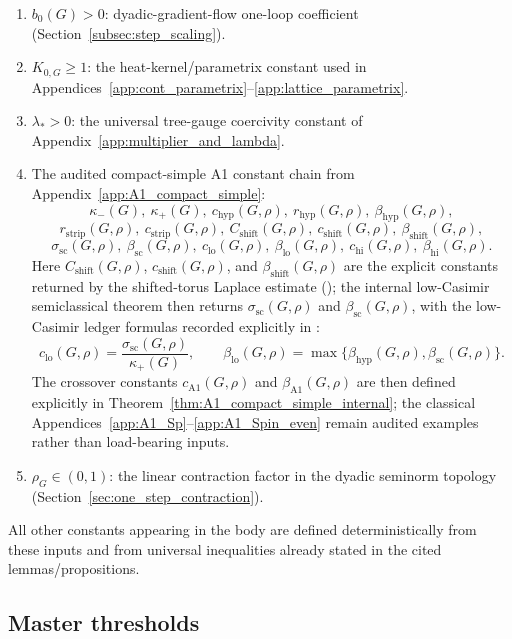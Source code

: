 \begin{enumerate}[label=(P\arabic*),leftmargin=*]
\item $b_0(G)>0$: dyadic-gradient-flow one-loop coefficient (Section~\ref{subsec:step_scaling}).
\item $K_{0,G}\ge 1$: the heat-kernel/parametrix constant used in Appendices~\ref{app:cont_parametrix}--\ref{app:lattice_parametrix}.
\item $\lambda_\ast>0$: the universal tree-gauge coercivity constant of Appendix~\ref{app:multiplier_and_lambda}.
\item The audited compact-simple A1 constant chain from Appendix~\ref{app:A1_compact_simple}:
\[
\kappa_-(G),\ \kappa_+(G),\ c_{\mathrm{hyp}}(G,\rho),\ r_{\mathrm{hyp}}(G,\rho),\ \beta_{\mathrm{hyp}}(G,\rho),
\]
\[
r_{\mathrm{strip}}(G,\rho),\ c_{\mathrm{strip}}(G,\rho),\ C_{\mathrm{shift}}(G,\rho),\ c_{\mathrm{shift}}(G,\rho),\ \beta_{\mathrm{shift}}(G,\rho),
\]
\[
\sigma_{\mathrm{sc}}(G,\rho),\ \beta_{\mathrm{sc}}(G,\rho),\ c_{\mathrm{lo}}(G,\rho),\ \beta_{\mathrm{lo}}(G,\rho),\ c_{\mathrm{hi}}(G,\rho),\ \beta_{\mathrm{hi}}(G,\rho).
\]
Here $C_{\mathrm{shift}}(G,\rho)$, $c_{\mathrm{shift}}(G,\rho)$, and $\beta_{\mathrm{shift}}(G,\rho)$ are the explicit constants returned by the shifted-torus Laplace estimate
(); the internal low-Casimir semiclassical theorem 
then returns $\sigma_{\mathrm{sc}}(G,\rho)$ and $\beta_{\mathrm{sc}}(G,\rho)$, with the low-Casimir ledger formulas recorded explicitly in :
\[
c_{\mathrm{lo}}(G,\rho)=\frac{\sigma_{\mathrm{sc}}(G,\rho)}{\kappa_+(G)},
\qquad
\beta_{\mathrm{lo}}(G,\rho)=\max\{\beta_{\mathrm{hyp}}(G,\rho),\beta_{\mathrm{sc}}(G,\rho)\}.
\]
The crossover constants $c_{\mathrm{A1}}(G,\rho)$ and $\beta_{\mathrm{A1}}(G,\rho)$ are then defined explicitly in Theorem~\ref{thm:A1_compact_simple_internal}; the classical Appendices~\ref{app:A1_Sp}--\ref{app:A1_Spin_even} remain audited examples rather than load-bearing inputs.
\item $\rho_G\in(0,1)$: the linear contraction factor in the dyadic seminorm topology (Section~\ref{sec:one_step_contraction}).
\end{enumerate}

All other constants appearing in the body are defined deterministically from these inputs and from universal
inequalities already stated in the cited lemmas/propositions.

\subsection{Master thresholds}

